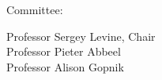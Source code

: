 \begin{titlepage}
\vfill



\hfill\begin{minipage}{\textwidth} %
\begin{center}
Committee: \\
\begin{spacing}{2.0}
\end{spacing}
Professor Sergey Levine, Chair \\
Professor Pieter Abbeel \\
Professor Alison Gopnik
\end{center}
\end{minipage}






\end{titlepage}   

